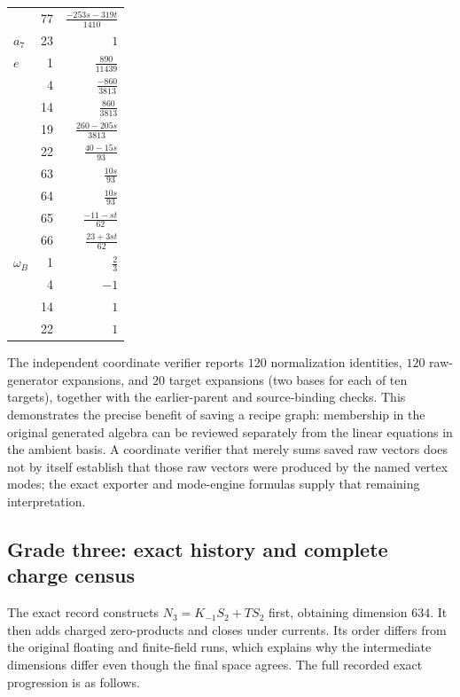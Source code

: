 \begin{longtable}{@{}lrr@{}}
 & 77 & $\frac{-253s-319t}{1410}$\\
$a_{7}$ & 23 & $1$\\
$e$ & 1 & $\frac{890}{11439}$\\
 & 4 & $\frac{-860}{3813}$\\
 & 14 & $\frac{860}{3813}$\\
 & 19 & $\frac{260-205s}{3813}$\\
 & 22 & $\frac{40-15s}{93}$\\
 & 63 & $\frac{10s}{93}$\\
 & 64 & $\frac{10s}{93}$\\
 & 65 & $\frac{-11-st}{62}$\\
 & 66 & $\frac{23+3st}{62}$\\
$\omega_B$ & 1 & $\frac{2}{3}$\\
 & 4 & $-1$\\
 & 14 & $1$\\
 & 22 & $1$\\
\end{longtable}
\endgroup
The independent coordinate verifier reports $120$ normalization
identities, $120$ raw-generator expansions, and $20$ target expansions
(two bases for each of ten targets), together with the earlier-parent
and source-binding checks. This demonstrates the precise benefit of
saving a recipe graph: membership in the original generated algebra
can be reviewed separately from the linear equations in the ambient
basis. A coordinate verifier that merely sums saved raw vectors does
not by itself establish that those raw vectors were produced by the
named vertex modes; the exact exporter and mode-engine formulas supply
that remaining interpretation.

\subsection{Grade three: exact history and complete charge census}
\label{expfinite:grade-three}

The exact record 
constructs $N_3=K_{-1}S_2+TS_2$ first, obtaining dimension $634$.
It then adds charged zero-products and closes under currents. Its
order differs from the original floating and finite-field runs, which
explains why the intermediate dimensions differ even though the final
space agrees. The full recorded exact progression is as follows.

